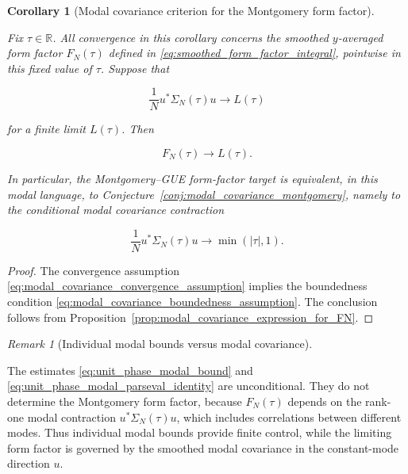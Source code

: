 \documentclass[11pt]{amsart}
\numberwithin{equation}{section}
\theoremstyle{plain}
\newtheorem{corollary}[theorem]{Corollary}
\theoremstyle{definition}
\theoremstyle{remark}
\newtheorem{remark}[theorem]{Remark}
\begin{document}
\begin{corollary}[Modal covariance criterion for the Montgomery form factor]
\label{cor:modal_covariance_montgomery_criterion}

Fix \(\tau\in\mathbb R\). All convergence in this corollary concerns the
smoothed \(y\)-averaged form factor \(F_N(\tau)\) defined in
\eqref{eq:smoothed_form_factor_integral}, pointwise in this fixed value
of \(\tau\). Suppose that

\begin{equation}
\frac1N
u^*\Sigma_N(\tau)u
\longrightarrow
L(\tau)
\label{eq:modal_covariance_convergence_assumption}
\end{equation}

for a finite limit \(L(\tau)\). Then

\begin{equation}
F_N(\tau)
\longrightarrow
L(\tau).
\label{eq:FN_converges_to_modal_covariance_limit}
\end{equation}

In particular, the Montgomery--GUE form-factor target is equivalent, in
this modal language, to
Conjecture~\ref{conj:modal_covariance_montgomery}, namely to the
conditional modal covariance contraction

\begin{equation}
\frac1N
u^*\Sigma_N(\tau)u
\longrightarrow
\min(|\tau|,1).
\label{eq:modal_covariance_montgomery_target}
\end{equation}

\end{corollary}

\begin{proof}
The convergence assumption \eqref{eq:modal_covariance_convergence_assumption}
implies the boundedness condition
\eqref{eq:modal_covariance_boundedness_assumption}. The conclusion follows
from Proposition~\ref{prop:modal_covariance_expression_for_FN}.
\end{proof}

\begin{remark}[Individual modal bounds versus modal covariance]
\label{rem:individual_bounds_vs_modal_covariance}

The estimates \eqref{eq:unit_phase_modal_bound} and
\eqref{eq:unit_phase_modal_parseval_identity} are unconditional. They do
not determine the Montgomery form factor, because \(F_N(\tau)\) depends
on the rank-one modal contraction \(u^*\Sigma_N(\tau)u\), which includes
correlations between different modes. Thus individual modal bounds
provide finite control, while the limiting form factor is governed by
the smoothed modal covariance in the constant-mode direction \(u\).

\end{remark}
\end{document}
